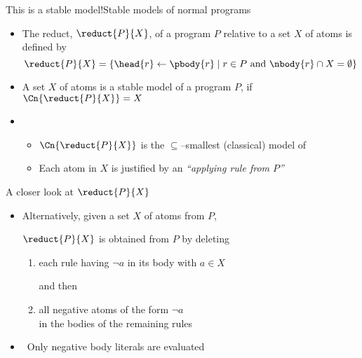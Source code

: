 \begin{frame}{This is a stable model!}{Stable models of normal programs}

  \begin{itemize}
  \item <2-> The \alert{reduct}, $\reduct{P}{X}$, of a program $P$ relative to
    a set $X$ of atoms is defined by
    \[
    \reduct{P}{X}
    =
    \{\head{r}\leftarrow\pbody{r} \mid r\in P \text{ and } \nbody{r}\cap X=\emptyset\}
    \]

  \item <3-> A set $X$ of atoms is a \alert{stable model} of a program $P$,
    if $\Cn{\reduct{P}{X}}=X$
    \bigskip
    \bigskip
  \item<4-> 
    \begin{itemize}\normalsize
    \item<4-> $\Cn{\reduct{P}{X}}$ is the $\subseteq$--smallest (classical) model of 
      \medskip
    \item<5-> Each atom in $X$ is justified by an \emph{``applying rule from $P$''}
    \end{itemize}
  \end{itemize}
\end{frame}
\begin{frame}{A closer look at ${\reduct{P}{X}}$}

  \bigskip
  \begin{itemize}
  \item<1->
    Alternatively, given a set $X$ of atoms from $P$,

    \bigskip

    $\reduct{P}{X}$ is obtained from $P$ by \alert<1>{deleting}

    \medskip

    \begin{enumerate}\normalsize
    \item each \alert<1>{rule} having \alert<2>{$\neg a$} in its body with $a\in X$

      and then

      \smallskip

    \item all \alert<1>{negative atoms} of the form \alert<2>{$\neg a$}  \\
      in the bodies of the remaining rules
    \end{enumerate}
    \bigskip
  \item<2->  \ Only \alert<2>{negative body literals} are evaluated
  \end{itemize}
\end{frame}
%
